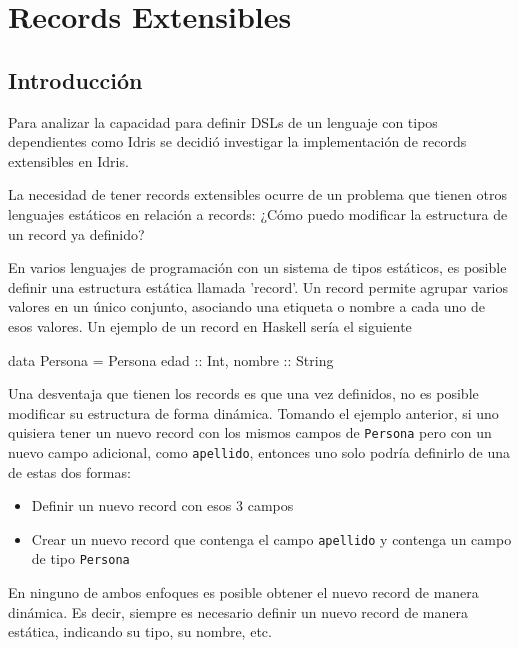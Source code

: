
\chapter{Records Extensibles}
\label{ch:2}

\section{Introducción}

Para analizar la capacidad para definir DSLs de un lenguaje con tipos dependientes como Idris se decidió investigar la implementación de records extensibles en Idris.

La necesidad de tener records extensibles ocurre de un problema que tienen otros lenguajes estáticos en relación a records: ¿Cómo puedo modificar la estructura de un record ya definido?

En varios lenguajes de programación con un sistema de tipos estáticos, es posible definir una estructura estática llamada 'record'. Un record permite agrupar varios valores en un único conjunto, asociando una etiqueta o nombre a cada uno de esos valores.
Un ejemplo de un record en Haskell sería el siguiente

\begin{code}
data Persona = Persona { edad :: Int, nombre :: String}
\end{code}

Una desventaja que tienen los records es que una vez definidos, no es posible modificar su estructura de forma dinámica. Tomando el ejemplo anterior, si uno quisiera tener un nuevo record con los mismos campos de \texttt{Persona} pero con un nuevo campo adicional, como \texttt{apellido}, entonces uno solo podría definirlo de una de estas dos formas:
\begin{itemize}[noitemsep]
\item Definir un nuevo record con esos 3 campos
\item Crear un nuevo record que contenga el campo \texttt{apellido} y contenga un campo de tipo \texttt{Persona}
\end{itemize}

En ninguno de ambos enfoques es posible obtener el nuevo record de manera dinámica. Es decir, siempre es necesario definir un nuevo record de manera estática, indicando su tipo, su nombre, etc.

